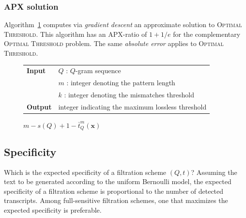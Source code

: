 \subsubsection{APX solution}

Algorithm~\ref{alg:qgram-threshold-apx} computes via \emph{gradient descent} an approximate solution to \textsc{Optimal Threshold}.
This algorithm has an APX-ratio of $1 + 1/e$ \citep{Vazirani2001} for the complementary \textsc{Optimal Threshold} problem.
The same \emph{absolute error} applies to \textsc{Optimal Threshold}.

\begin{figure}[h]
\begin{center}
\begin{minipage}[t]{.8\textwidth}
\begin{algorithm}[H]
\begin{tabular}{ll}
\textbf{Input}  & $Q$ : $Q$-gram sequence\\
				& $m$ : integer denoting the pattern length\\
				& $k$ : integer denoting the mismatches threshold\\
\textbf{Output} & integer indicating the maximum lossless threshold\\
\end{tabular}
\begin{algorithmic}[1]
\EndWhile
\State \Return $m - s(Q) + 1 - \bar{t}^m_Q(\mathbf{x})$
\end{algorithmic}
\label{alg:qgram-threshold-apx}
\end{algorithm}
\end{minipage}
\end{center}
\end{figure}

\subsection{Specificity}
\label{sub:qgram-specificity}

Which is the expected specificity of a filtration scheme $(Q,t)$?
Assuming the text to be generated according to the uniform Bernoulli model, the expected specificity of a filtration scheme is proportional to the number of detected transcripts.
Among full-sensitive filtration schemes, one that maximizes the expected specificity is preferable.

